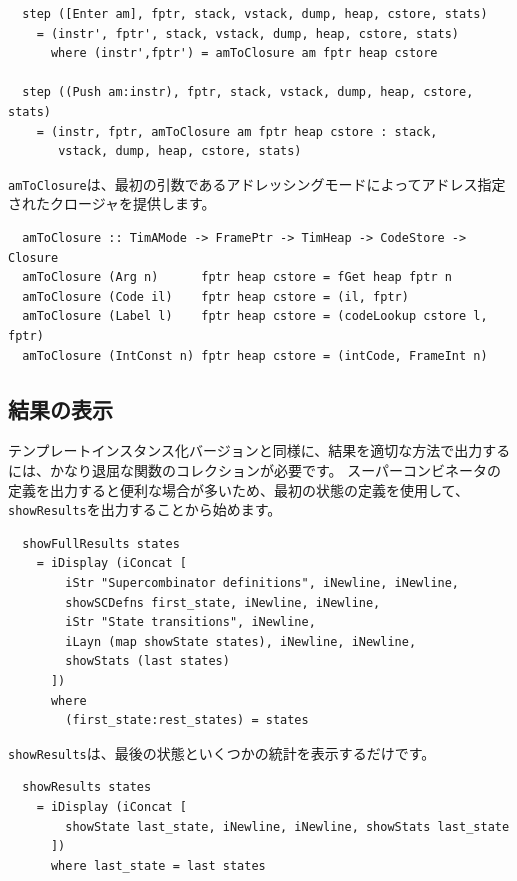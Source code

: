 \documentclass{jbook}
\begin{document}
\begin{verbatim}
  step ([Enter am], fptr, stack, vstack, dump, heap, cstore, stats)
    = (instr', fptr', stack, vstack, dump, heap, cstore, stats)
      where (instr',fptr') = amToClosure am fptr heap cstore

  step ((Push am:instr), fptr, stack, vstack, dump, heap, cstore, stats)
    = (instr, fptr, amToClosure am fptr heap cstore : stack,
       vstack, dump, heap, cstore, stats)
\end{verbatim}

\texttt{amToClosure}は、最初の引数であるアドレッシングモードによってアドレス指定されたクロージャを提供します。

\begin{verbatim}
  amToClosure :: TimAMode -> FramePtr -> TimHeap -> CodeStore -> Closure
  amToClosure (Arg n)      fptr heap cstore = fGet heap fptr n
  amToClosure (Code il)    fptr heap cstore = (il, fptr)
  amToClosure (Label l)    fptr heap cstore = (codeLookup cstore l, fptr)
  amToClosure (IntConst n) fptr heap cstore = (intCode, FrameInt n)
\end{verbatim}

\subsection{結果の表示}

テンプレートインスタンス化バージョンと同様に、結果を適切な方法で出力するには、かなり退屈な関数のコレクションが必要です。
スーパーコンビネータの定義を出力すると便利な場合が多いため、最初の状態の定義を使用して、\texttt{showResults}を出力することから始めます。

\begin{verbatim}
  showFullResults states
    = iDisplay (iConcat [
        iStr "Supercombinator definitions", iNewline, iNewline,
        showSCDefns first_state, iNewline, iNewline,
        iStr "State transitions", iNewline,
        iLayn (map showState states), iNewline, iNewline,
        showStats (last states)
      ])
      where
        (first_state:rest_states) = states
\end{verbatim}

\texttt{showResults}は、最後の状態といくつかの統計を表示するだけです。

\begin{verbatim}
  showResults states
    = iDisplay (iConcat [
        showState last_state, iNewline, iNewline, showStats last_state
      ])
      where last_state = last states
\end{verbatim}
\end{document}
